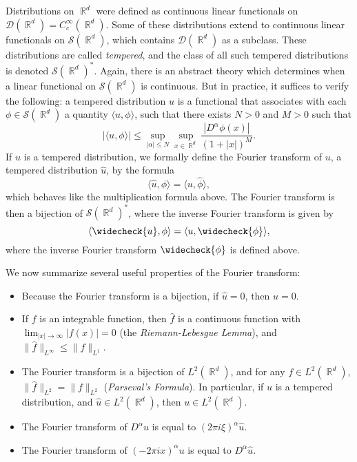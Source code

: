 \documentclass{exam}
\DeclareMathOperator{\RR}{\mathbb{R}}
\theoremstyle{problemstyle}
\newcommand{\1}[1]{\textbf{1}_{\left[#1\right]}} %
\begin{document}
\begin{questions}
Distributions on $\RR^d$ were defined as continuous linear functionals on $\mathcal{D}(\RR^d) = C_c^\infty(\RR^d)$. Some of these distributions extend to continuous linear functionals on $\mathcal{S}(\RR^d)$, which contains $\mathcal{D}(\RR^d)$ as a subclass. These distributions are called \emph{tempered}, and the class of all such tempered distributions is denoted $\mathcal{S}(\RR^d)^*$. Again, there is an abstract theory which determines when a linear functional on $\mathcal{S}(\RR^d)$ is continuous. But in practice, it suffices to verify the following: a tempered distribution $u$ is a functional that associates with each $\phi \in \mathcal{S}(\RR^d)$ a quantity $\langle u, \phi \rangle$, such that there exists $N > 0$ and $M > 0$ such that
%
\[ |\langle u, \phi \rangle| \leq \sup_{|\alpha| \leq N} \sup_{x \in \RR^d} \frac{|D^\alpha \phi(x)|}{(1 + |x|)^M}. \]
%
If $u$ is a tempered distribution, we formally define the Fourier transform of $u$, a tempered distribution $\widehat{u}$, by the formula
%
\[ \langle \widehat{u}, \phi \rangle = \langle u, \widehat{\phi} \rangle, \]
%
which behaves like the multiplication formula above. The Fourier transform is then a bijection of $\mathcal{S}(\RR^d)^*$, where the inverse Fourier transform is given by
%
\[ \langle \widecheck{u}, \phi \rangle = \langle u, \widecheck{\phi} \rangle, \]
%
where the inverse Fourier transform $\widecheck{\phi}$ is defined above.

We now summarize several useful properties of the Fourier transform:
%
\begin{itemize}
	\item Because the Fourier transform is a bijection, if $\widehat{u} = 0$, then $u = 0$.

	\item If $f$ is an integrable function, then $\widehat{f}$ is a continuous function with $\lim_{|x| \to \infty} |f(x)| = 0$ (the \emph{Riemann-Lebesgue Lemma}), and $\| \widehat{f} \|_{L^\infty} \leq \| f \|_{L^1}$.

	\item The Fourier transform is a bijection of $L^2(\RR^d)$, and for any $f \in L^2(\RR^d)$, $\| \widehat{f} \|_{L^2} = \| f \|_{L^2}$ (\emph{Parseval's Formula}). In particular, if $u$ is a tempered distribution, and $\widehat{u} \in L^2(\RR^d)$, then $u \in L^2(\RR^d)$.

	\item The Fourier transform of $D^\alpha u$ is equal to $(2 \pi i \xi)^\alpha \widehat{u}$.

	\item The Fourier transform of $(- 2 \pi i x)^\alpha u$ is equal to $D^\alpha \widehat{u}$.


\end{itemize}
\end{questions}
\end{document}
